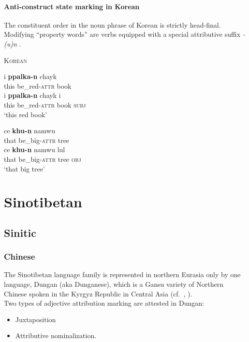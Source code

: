 \paragraph{Anti-construct state marking in Korean}
The constituent order in the noun phrase of Korean is strictly head-final. Modifying “property words” are verbs equipped with a special attributive suffix \textit{-(u)n} \citep{martin-etal1969}.
\begin{exe}
\ex \textsc{Korean} \citep[61]{chang1996}
\begin{xlist}
\ex
\begin{xlist}
\ex
\gll	i \textbf{ppalka-n} chayk\\
	this be\_red-\textsc{attr} book\\
\ex	
\gll	i \textbf{ppalka-n} chayk i\\
	this be\_red-\textsc{attr} book \textsc{subj}\\
\glt	‘this red book’
\end{xlist}
\ex
\begin{xlist}
\ex	
\gll	ce \textbf{khu-n} namwu\\
	that be\_big-\textsc{attr} tree\\
\ex
\gll	ce \textbf{khu-n} namwu lul\\
	that be\_big-\textsc{attr} tree \textsc{obj}\\
\glt	‘that big tree’
\end{xlist}
\end{xlist}
\end{exe}

\section{Sinotibetan}\label{sinotibetan synchr}
\subsection{Sinitic}
\subsubsection{Chinese}
The Sinotibetan language family is represented in northern Eurasia only by one language, Dungan (aka Dunganese), which is a Gansu variety of Northern Chinese spoken in the Kyrgyz Republic in Central Asia (cf.~\citealt[85]{yuo2003}, \citealt{kalimov1968}).\\

\noindent Two types of adjective attribution marking are attested in Dungan:
\begin{itemize}
\item Juxtaposition
\item Attributive nominalization.
\end{itemize}

